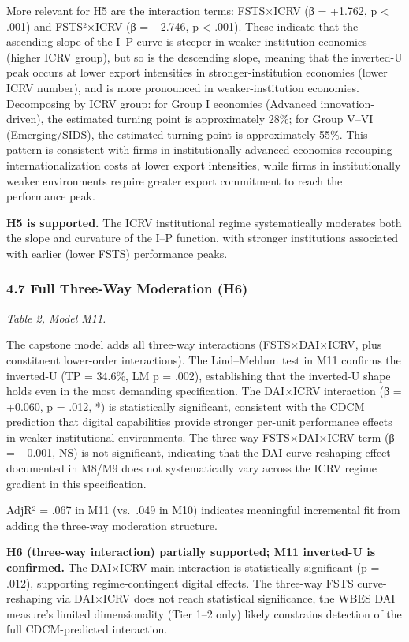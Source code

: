 \documentclass[
  12pt,a4paper]{article}
\begin{document}
More relevant for H5 are the interaction terms: FSTS×ICRV (β = +1.762, p
\textless{} .001) and FSTS²×ICRV (β = −2.746, p \textless{} .001). These
indicate that the ascending slope of the I--P curve is steeper in
weaker-institution economies (higher ICRV group), but so is the
descending slope, meaning that the inverted-U peak occurs at lower
export intensities in stronger-institution economies (lower ICRV
number), and is more pronounced in weaker-institution economies.
Decomposing by ICRV group: for Group I economies (Advanced
innovation-driven), the estimated turning point is approximately 28\%;
for Group V--VI (Emerging/SIDS), the estimated turning point is
approximately 55\%. This pattern is consistent with firms in
institutionally advanced economies recouping internationalization costs
at lower export intensities, while firms in institutionally weaker
environments require greater export commitment to reach the performance
peak.

\textbf{H5 is supported.} The ICRV institutional regime systematically
moderates both the slope and curvature of the I--P function, with
stronger institutions associated with earlier (lower FSTS) performance
peaks.

\hypertarget{full-three-way-moderation-h6}{%
\subsubsection{4.7 Full Three-Way Moderation
(H6)}\label{full-three-way-moderation-h6}}

\emph{Table 2, Model M11.}

The capstone model adds all three-way interactions (FSTS×DAI×ICRV, plus
constituent lower-order interactions). The Lind--Mehlum test in M11
confirms the inverted-U (TP = 34.6\%, LM p = .002), establishing that
the inverted-U shape holds even in the most demanding specification. The
DAI×ICRV interaction (β = +0.060, p = .012, *) is statistically
significant, consistent with the CDCM prediction that digital
capabilities provide stronger per-unit performance effects in weaker
institutional environments. The three-way FSTS×DAI×ICRV term (β =
−0.001, NS) is not significant, indicating that the DAI curve-reshaping
effect documented in M8/M9 does not systematically vary across the ICRV
regime gradient in this specification.

AdjR² = .067 in M11 (vs.~.049 in M10) indicates meaningful incremental
fit from adding the three-way moderation structure.

\textbf{H6 (three-way interaction) partially supported; M11 inverted-U
is confirmed.} The DAI×ICRV main interaction is statistically
significant (p = .012), supporting regime-contingent digital effects.
The three-way FSTS curve-reshaping via DAI×ICRV does not reach
statistical significance, the WBES DAI measure's limited dimensionality
(Tier 1--2 only) likely constrains detection of the full CDCM-predicted
interaction.
\end{document}

